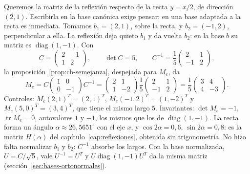 \begin{ejemplo}\label{ej:cb-reflexion}
Queremos la matriz de la reflexión respecto de la recta \(y=x/2\), de dirección \((2,1)\).
Escribirla en la base canónica exige pensar; en una base adaptada a la recta es inmediata.
Tomamos \(b_1=(2,1)\), sobre la recta, y \(b_2=(-1,2)\), perpendicular a ella. La reflexión deja
quieto \(b_1\) y da vuelta \(b_2\): en la base \(b\) su matriz es \(\operatorname{diag}(1,-1)\).
Con
\[
  C=\begin{pmatrix}2&-1\\1&2\end{pmatrix},\qquad \det C=5,\qquad
  C^{-1}=\frac15\begin{pmatrix}2&1\\-1&2\end{pmatrix},
\]
la proposición~\ref{prop:cb-semejanza}, despejada para \(M_e\), da
\[
  M_e=C\begin{pmatrix}1&0\\0&-1\end{pmatrix}C^{-1}
  =\begin{pmatrix}2&1\\1&-2\end{pmatrix}\frac15\begin{pmatrix}2&1\\-1&2\end{pmatrix}
  =\frac15\begin{pmatrix}3&4\\4&-3\end{pmatrix}.
\]
Controles: \(M_e(2,1)^T=(2,1)^T\), \(M_e(-1,2)^T=(1,-2)^T\) y \(M_e(5,0)^T=(3,4)^T\), que tiene
el mismo largo \(5\). Invariantes: \(\det M_e=-1\), \(\operatorname{tr}M_e=0\), autovalores
\(1\) y \(-1\), los mismos que los de \(\operatorname{diag}(1,-1)\). La recta forma un ángulo
\(\alpha\approx26{,}5651^\circ\) con el eje \(x\), y \(\cos2\alpha=0{,}6\),
\(\sin2\alpha=0{,}8\): es la matriz \(H(\alpha)\) del capítulo~\ref{cap:reflexiones},
obtenida sin trigonometría. No hizo falta normalizar \(b_1\) y \(b_2\): \(C^{-1}\) absorbe los
largos. Con la base normalizada, \(U=C/\sqrt5\), vale \(U^{-1}=U^T\) y
\(U\operatorname{diag}(1,-1)U^T\) da la misma matriz (sección~\ref{sec:bases-ortonormales}).
\end{ejemplo}


